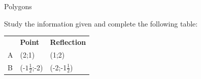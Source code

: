 \begin{exercises}{Polygons}
\begin{figure}[H]
 \end{figure}   

    \addtocounter{footnote}{-0}
    
          \par 
          \label{m39358*id71863}Study the information given and complete the following table:\par 
          
    
          \begin{table}[H]
        
    
        \begin{center}
      
      \label{m39358*id71867}
      
    \noindent
      \tablelasttail{}
      \begin{xtabular}[t]{|l|l|l|}\hline
    
    
         &
    
    
        
                    \textbf{Point}
                   &
    
    
        
                    \textbf{Reflection}
     \tabularnewline{}
    
    
        A &
    
    
        (2;1) &
    
    
        (1;2)%
     \tabularnewline{}
    
    
        B &
    
    
        (-$1\frac{1}{2}$;-2) &
    
    
        (-2;-1$\frac{1}{2}$)%
     \tabularnewline{}
    

\end{xtabular}
\end{center}
\end{table}
\end{exercises}
